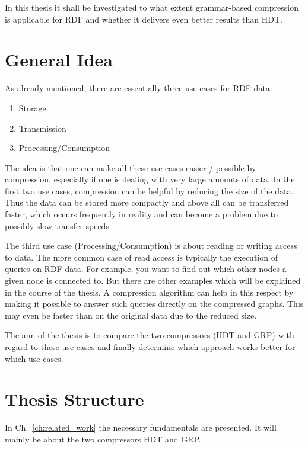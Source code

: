 In this thesis it shall be investigated to what extent grammar-based compression is applicable for RDF and whether it delivers even better results than HDT.


\section{General Idea}

As already mentioned, there are essentially three use cases for RDF data:

\begin{enumerate}
	\item Storage
	\item Transmission
	\item Processing/Consumption
\end{enumerate}

The idea is that one can make all these use cases easier / possible by compression, especially if one is dealing with very large amounts of data. In the first two use cases, compression can be helpful by reducing the size of the data. Thus the data can be stored more compactly and above all can be transferred faster, which occurs frequently in reality and can become a problem due to possibly slow transfer speeds .

The third use case (Processing/Consumption) is about reading or writing access to data. The more common case of read access is typically the execution of queries on RDF data. For example, you want to find out which other nodes a given node is connected to. But there are other examples which will be explained in the course of the thesis. A compression algorithm can help in this respect by making it possible to answer such queries directly on the compressed graphs. This may even be faster than on the original data due to the reduced size.

The aim of the thesis is to compare the two compressors (HDT and GRP) with regard to these use cases and finally determine which approach works better for which use cases.



\section{Thesis Structure}

In Ch.~\ref{ch:related_work} the necessary fundamentals are presented. It will mainly be about the two compressors HDT and GRP. 

